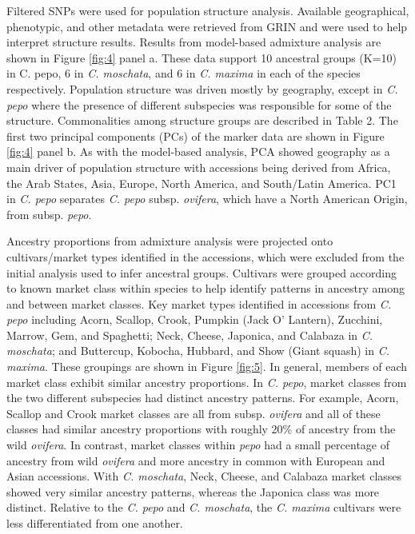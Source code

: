 \documentclass[utf8]{FrontiersinHarvard} %
\begin{document}
Filtered SNPs were used for population structure analysis. Available geographical, phenotypic, and other metadata were retrieved from GRIN and were used to help interpret structure results. Results from model-based admixture analysis are shown in Figure \ref{fig:4} panel a. These data support 10 ancestral groups (K=10) in C. pepo, 6 in \textit{C. moschata}, and 6 in \textit{C. maxima} in each of the species respectively. Population structure was driven mostly by geography, except in \textit{C. pepo} where the presence of different subspecies was responsible for some of the structure. Commonalities among structure groups are described in Table 2. The first two principal components (PCs) of the marker data are shown in Figure \ref{fig:4} panel b. As with the model-based analysis, PCA showed geography as a main driver of population structure with accessions being derived from Africa, the Arab States, Asia, Europe, North America, and South/Latin America. PC1 in \textit{C. pepo} separates \textit{C. pepo} subsp. \textit{ovifera}, which have a North American Origin, from subsp. \textit{pepo}.

Ancestry proportions from admixture analysis were projected onto cultivars/market types identified in the accessions, which were excluded from the initial analysis used to infer ancestral groups. Cultivars were grouped according to known market class within species to help identify patterns in ancestry among and between market classes. Key market types identified in accessions from \textit{C. pepo} including Acorn, Scallop, Crook, Pumpkin (Jack O’ Lantern), Zucchini, Marrow, Gem, and Spaghetti; Neck, Cheese, Japonica, and Calabaza in \textit{C. moschata}; and Buttercup, Kobocha, Hubbard, and Show (Giant squash) in \textit{C. maxima}. These groupings are shown in Figure \ref{fig:5}. In general, members of each market class exhibit similar ancestry proportions. In \textit{C. pepo}, market classes from the two different subspecies had distinct ancestry patterns. For example, Acorn, Scallop and Crook market classes are all from subsp. \textit{ovifera} and all of these classes had similar ancestry proportions with roughly 20\% of ancestry from the wild \textit{ovifera}. In contrast, market classes within \textit{pepo} had a small percentage of ancestry from wild \textit{ovifera} and more ancestry in common with European and Asian accessions. With \textit{C. moschata}, Neck, Cheese, and Calabaza market classes showed very similar ancestry patterns, whereas the Japonica class was more distinct. Relative to the \textit{C. pepo} and \textit{C. moschata}, the \textit{C. maxima} cultivars were less differentiated from one another.
\end{document}
